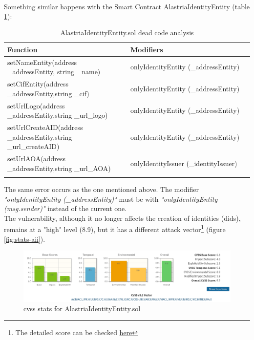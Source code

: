 Something similar happens with the Smart Contract AlastriaIdentityEntity (table \ref{tab:dead-code-entity}):
\newpage
\begin{longtable}{||p{0.5\linewidth} | p{0.5\linewidth}||}
    \hline
    \textbf{Function}                                                                  & \textbf{Modifiers}                    \\ [0.5ex]
    \hline\hline
    setNameEntity\newline (address \_addressEntity, string \_name)                     & onlyIdentityEntity (\_addressEntity)  \\
    \hline
    setCifEntity\newline (address \_addressEntity,\newline string \_cif)               & onlyIdentityEntity (\_addressEntity)  \\
    \hline
    setUrlLogo\newline (address \_addressEntity,\newline string \_url\_logo)           & onlyIdentityEntity (\_addressEntity)  \\
    \hline
    setUrlCreateAID\newline (address \_addressEntity,\newline string \_url\_createAID) & onlyIdentityEntity (\_addressEntity)  \\
    \hline
    setUrlAOA\newline (address \_addressEntity,\newline string \_url\_AOA)             & onlyIdentityIssuer (\_identityIssuer) \\[1ex]
    \hline
    \caption{AlastriaIdentityEntity.sol dead code analysis}
    \label{tab:dead-code-entity}
\end{longtable}
The same error occurs as the one mentioned above. The modifier \textit{"onlyIdentityEntity (\_addressEntity)"} must be with \textit{"onlyIdentityEntity (msg.sender)"} instead of the current one.\\

The vulnerability, although it no longer affects the creation of identities (\acrshort{did}s), remains at a "high" level (8.9), but it has a different attack vector\footnote{The detailed score can be checked \href{https://nvd.nist.gov/vuln-metrics/cvss/v3-calculator?vector=AV:N/AC:L/PR:H/UI:N/S:C/C:H/I:N/A:N/E:F/RL:O/RC:R/CR:H/IR:X/AR:X/MAV:N/MAC:L/MPR:N/MUI:N/MS:C/MC:H/MI:X/MA:X&version=3.1}{here}} (figure \ref{fig:stats-aii}).\\
\begin{figure}[h]
    \centering
    \includegraphics[width=1.1\textwidth]{images/Security Audit/stats-aie.png}
    \caption{\acrshort{cvss} stats for AlastriaIdentityEntity.sol}
    \label{fig:stats-aie}
\end{figure}